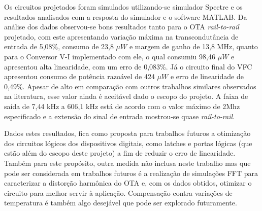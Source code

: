 \documentclass[
	12pt,				%
	oneside,			%
	a4paper,			%
	english,			%
	french,				%
	spanish,			%
	brazil				%
	]{abntex2}
\begin{document}
Os circuitos projetados foram simulados utilizando-se simulador Spectre e os resultados analisados com a resposta do simulador e o software MATLAB. Da análise dos dados observou-se bons resultados tanto para o OTA \textit{rail-to-rail} projetado, com este apresentando variação máxima na transcondutância de entrada de 5,08\%, consumo de 23,8 $\mu W$ e margem de ganho de 13,8 MHz, quanto para o Conversor V-I implementado com ele, o qual consumiu 98,46 $\mu W$ e apresentou alta linearidade, com um erro de 0,083\%. Já o circuito final do VFC apresentou consumo de potência razoável de 424 $\mu W$ e erro de linearidade de 0,49\%. Apesar de alto em comparação com outros trabalhos similares observados na literatura, esse valor ainda é aceitável dado o escopo do projeto. A faixa de saída de 7,44 kHz a 606,1 kHz está de acordo com o valor máximo de 2Mhz especificado e a extensão do sinal de entrada mostrou-se quase \textit{rail-to-rail}. 

Dados estes resultados, fica como proposta para trabalhos futuros a otimização dos circuitos lógicos dos dispositivos digitais, como latches e portas lógicas (que estão além do escopo deste projeto) a fim de reduzir o erro de linearidade. Também para este propósito, outra medida não inclusa neste trabalho mas que pode ser considerada em trabalhos futuros é a realização de simulações FFT para caracterizar a distorção harmônica do OTA e, com os dados obtidos, otimizar o circuito para melhor servir à aplicação. Compensação contra variações de temperatura é também algo desejável que pode ser explorado futuramente.      


\postextual



%
%




\end{document}
